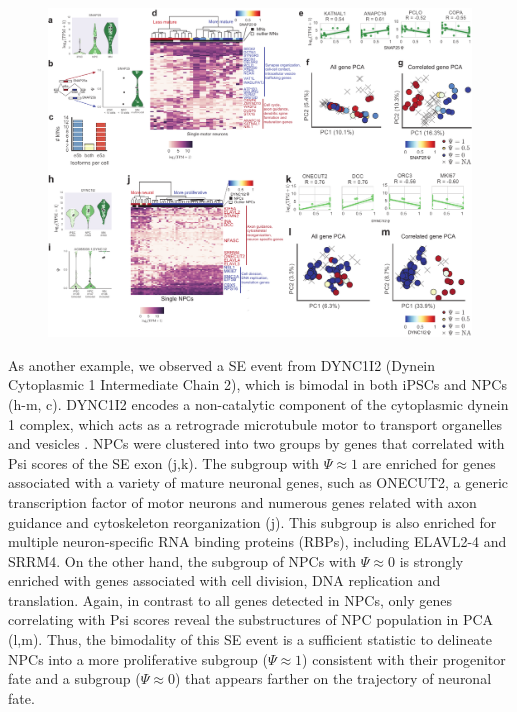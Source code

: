 \begin{figure}[h]
\ContinuedFloat
\captionsetup{labelformat=empty}
\centering
\includegraphics[width=5.8in]{figures/hidden_cell_states.pdf}
\end{figure}
\clearpage


As another example, we observed a SE event from DYNC1I2 (Dynein Cytoplasmic 1 Intermediate Chain 2), which is bimodal in both iPSCs and NPCs (h-m, c). DYNC1I2 encodes a non-catalytic component of the cytoplasmic dynein 1 complex, which acts as a retrograde microtubule motor to transport organelles and vesicles \cite{crackower1999-paperpile}. NPCs were clustered into two groups by genes that correlated with Psi scores of the SE exon (j,k). The subgroup with $\Psi \approx 1$ are enriched for genes associated with a variety of mature neuronal genes, such as ONECUT2, a generic transcription factor of motor neurons and numerous genes related with axon guidance and cytoskeleton reorganization (j). This subgroup is also enriched for multiple neuron-specific RNA binding proteins (RBPs), including ELAVL2-4 and SRRM4. On the other hand, the subgroup of NPCs with $\Psi \approx 0$ is strongly enriched with genes associated with cell division, DNA replication and translation. Again, in contrast to all genes detected in NPCs, only genes correlating with Psi scores reveal the substructures of NPC population in PCA (l,m). Thus, the bimodality of this SE event is a sufficient statistic to delineate NPCs into a more proliferative subgroup ($\Psi \approx 1$) consistent with their progenitor fate and a subgroup ($\Psi \approx 0$) that appears farther on the trajectory of neuronal fate.

